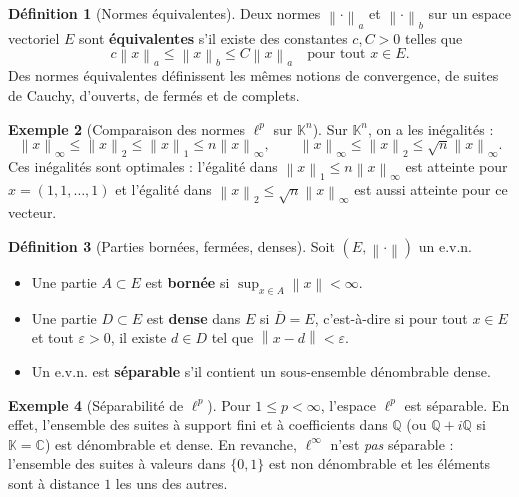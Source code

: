 \documentclass[a4paper,12pt]{book}
\newcommand{\Q}{\mathbb{Q}}
\newcommand{\C}{\mathbb{C}}
\newcommand{\K}{\mathbb{K}}
\newcommand{\norm}[1]{\left\| #1 \right\|}
\theoremstyle{definition}
\newtheorem{definition}{Définition}[chapter]
\newtheorem{exemple}[definition]{Exemple}
\theoremstyle{plain}
\theoremstyle{remark}
\begin{document}
\begin{definition}[Normes équivalentes]\label{def:normes-equivalentes}
Deux normes $\norm{\cdot}_a$ et $\norm{\cdot}_b$ sur un espace vectoriel $E$ sont \textbf{équivalentes} s'il existe des constantes $c, C > 0$ telles que
\[
    c \norm{x}_a \leq \norm{x}_b \leq C \norm{x}_a \quad \text{pour tout } x \in E.
\]
Des normes équivalentes définissent les mêmes notions de convergence, de suites de Cauchy, d'ouverts, de fermés et de complets.
\end{definition}

\begin{exemple}[Comparaison des normes $\ell^p$ sur $\K^n$]\label{ex:comparaison-normes-Kn}
\index{normes équivalentes!sur $\K^n$}
Sur $\K^n$, on a les inégalités :
\[
    \norm{x}_\infty \leq \norm{x}_2 \leq \norm{x}_1 \leq n \norm{x}_\infty, \qquad
    \norm{x}_\infty \leq \norm{x}_2 \leq \sqrt{n}\norm{x}_\infty.
\]
Ces inégalités sont optimales : l'égalité dans $\norm{x}_1 \leq n\norm{x}_\infty$ est atteinte pour $x = (1,1,\ldots,1)$ et l'égalité dans $\norm{x}_2 \leq \sqrt{n}\norm{x}_\infty$ est aussi atteinte pour ce vecteur.
\end{exemple}

\begin{definition}[Parties bornées, fermées, denses]\label{def:parties-evn}
Soit $(E, \norm{\cdot})$ un e.v.n.
\begin{itemize}
    \item Une partie $A \subset E$ est \textbf{bornée} si $\sup_{x \in A}\norm{x} < \infty$.
    \item Une partie $D \subset E$ est \textbf{dense} dans $E$ si $\overline{D} = E$, c'est-à-dire si pour tout $x \in E$ et tout $\varepsilon > 0$, il existe $d \in D$ tel que $\norm{x - d} < \varepsilon$.
    \item Un e.v.n. est \textbf{séparable} s'il contient un sous-ensemble dénombrable dense.
\end{itemize}
\end{definition}

\begin{exemple}[Séparabilité de $\ell^p$]\label{ex:ell-p-separable}
Pour $1 \leq p < \infty$, l'espace $\ell^p$ est séparable. En effet, l'ensemble des suites à support fini et à coefficients dans $\Q$ (ou $\Q + i\Q$ si $\K = \C$) est dénombrable et dense. En revanche, $\ell^\infty$ n'est \emph{pas} séparable : l'ensemble des suites à valeurs dans $\{0,1\}$ est non dénombrable et les éléments sont à distance $1$ les uns des autres.
\end{exemple}
\end{document}
